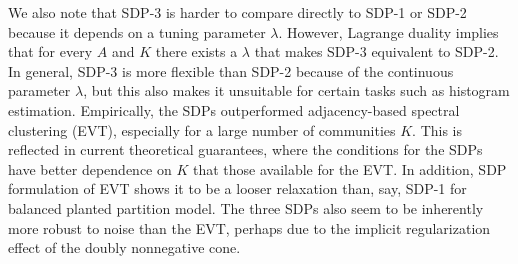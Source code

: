 
 We also note that SDP-3 is harder to compare directly to SDP-1 or SDP-2 because it depends on a 
tuning parameter $\lambda$.  However,  Lagrange duality implies that
for every $A$ and $K$ there exists a $\lambda$ that makes SDP-3
equivalent to SDP-2.  In general, SDP-3 is more flexible than SDP-2 because of the continuous parameter $\lambda$, but this also makes it unsuitable for certain tasks such as histogram estimation.   
Empirically, the SDPs outperformed adjacency-based spectral clustering (EVT), especially for a large number of communities $K$. This is reflected in current theoretical guarantees, where the conditions for the SDPs have better dependence on $K$ that those available for the EVT. In addition, SDP formulation of EVT shows it to be a looser relaxation than, say, SDP-1 for balanced planted partition model. The three SDPs also seem to be inherently more robust to noise than the EVT, perhaps due to the implicit regularization effect of the doubly nonnegative cone.




